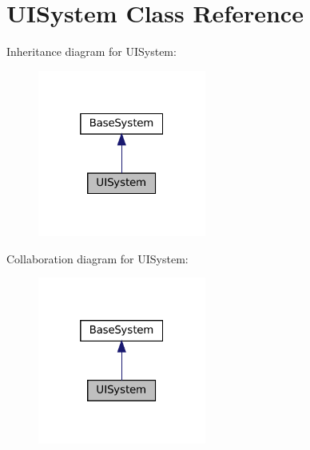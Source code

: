 \hypertarget{classUISystem}{}\section{U\+I\+System Class Reference}
\label{classUISystem}


Inheritance diagram for U\+I\+System\+:\nopagebreak
\begin{figure}[H]
\begin{center}
\leavevmode
\includegraphics[width=157pt]{classUISystem__inherit__graph}
\end{center}
\end{figure}


Collaboration diagram for U\+I\+System\+:\nopagebreak
\begin{figure}[H]
\begin{center}
\leavevmode
\includegraphics[width=157pt]{classUISystem__coll__graph}
\end{center}
\end{figure}
